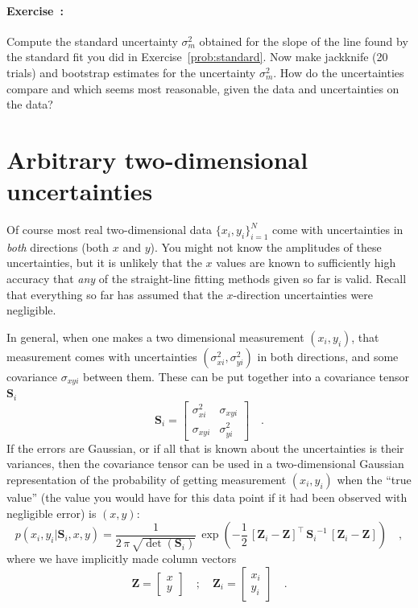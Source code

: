 \documentclass[12pt,twoside]{article}
\newcommand{\problemname}{Exercise}
\newcounter{problem}
\newenvironment{problem}{\paragraph{\problemname~\theproblem:}\refstepcounter{problem}}{}
\newcommand{\mmatrix}[1]{\boldsymbol{#1}}
\newcommand{\inverse}[1]{{#1}^{-1}}
\newcommand{\transpose}[1]{{#1}^{\scriptscriptstyle \top}}
\newcommand{\mS}{\mmatrix{S}}
\newcommand{\mZ}{\mmatrix{Z}}
\newcommand{\setofall}[3]{\{{#1}\}_{{#2}}^{{#3}}}
\newcommand{\allxy}{\setofall{x_i,y_i}{i=1}{N}}
\begin{document}
\begin{problem}
Compute the standard uncertainty $\sigma_m^2$ obtained for the slope
of the line found by the standard fit you did in
\problemname~\ref{prob:standard}.  Now make jackknife (20 trials) and
bootstrap estimates for the uncertainty $\sigma_m^2$.  How do the
uncertainties compare and which seems most reasonable, given the data
and uncertainties on the data?
\end{problem}

\section{Arbitrary two-dimensional uncertainties}\label{sec:twod}

Of course most real two-dimensional data $\allxy$ come with
uncertainties in \emph{both} directions (both $x$ and $y$).  You might
not know the amplitudes of these uncertainties, but it is unlikely
that the $x$ values are known to sufficiently high accuracy that
\emph{any} of the straight-line fitting methods given so far is valid.
Recall that everything so far has assumed that the $x$-direction
uncertainties were negligible.

In general, when one makes a two dimensional measurement $(x_i,y_i)$,
that measurement comes with uncertainties $(\sigma_{xi}^2,\sigma_{yi}^2)$
in both directions, and some covariance $\sigma_{xyi}$ between them.
These can be put together into a covariance tensor $\mS_i$
\begin{equation}
\mS_i = \left[\begin{array}{cc}
\sigma_{xi}^2 & \sigma_{xyi} \\ \sigma_{xyi} & \sigma_{yi}^2
\end{array}\right] \quad .
\end{equation}
If the errors are Gaussian, or if all that is known about the
uncertainties is their variances, then the covariance tensor can be
used in a two-dimensional Gaussian representation of the probability
of getting measurement $(x_i,y_i)$ when the ``true value'' (the value
you would have for this data point if it had been observed with
negligible error) is $(x,y)$:
\begin{equation}
p(x_i,y_i|\mS_i,x,y) = \frac{1}{2\,\pi\,\sqrt{\det(\mS_i)}}
  \,\exp\left(-\frac{1}{2}\,\transpose{\left[\mZ_i - \mZ\right]}
  \,\inverse{\mS_i}\,\left[\mZ_i - \mZ\right]\right) \quad ,
\end{equation}
where we have implicitly made column vectors
\begin{equation}\label{eq:mZ}
\mZ = \left[\begin{array}{c} x \\ y \end{array}\right] \quad ; \quad
\mZ_i = \left[\begin{array}{c} x_i \\ y_i \end{array}\right] \quad .
\end{equation}
\end{document}

